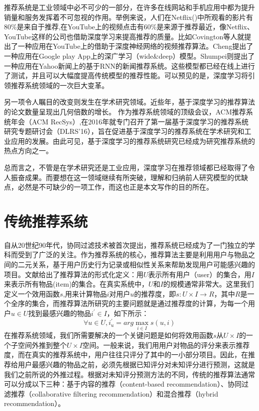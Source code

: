 推荐系统是工业领域中必不可少的一部分，在许多在线网站和手机应用中都为提升销量和服务发挥着不可忽视的作用。举例来说，人们在Netflix()中所观看的影片有$80\%$是来自于推荐\cite{Gomez-UribeH16Netflix},在YouTube上的视频点击有60\%是来源于推荐\cite{DavidsonLLNVGGHLLS10Youtube}最近，像Netflix、YouTube这样的公司也借助深度学习来提高推荐的质量\cite{ChengKHSCAACCIA16Wide&Deep}\cite{CovingtonAS16YouTube}\cite{OkuraTOT17Embedding}。比如Covington等人就提出了一种应用在YouTube上的借助于深度神经网络的视频推荐算法\cite{CovingtonAS16YouTube}。Cheng提出了一种应用在Google play App上的深广学习（wide\&deep）模型\cite{ChengKHSCAACCIA16Wide&Deep}。Shumpei则提出了一种应用在Yahoo新闻上的基于RNN的新闻推荐系统\cite{OkuraTOT17Embedding}。这些模型都已经在线上进行了测试，并且可以大幅度提高传统模型的推荐性能。可以预见的是，深度学习将引领推荐系统领域的一次巨大变革。

另一项令人瞩目的改变则发生在学术研究领域。近些年，基于深度学习的推荐算法的论文数量呈现出几何倍数的增长。
作为推荐系统领域的顶级会议，ACM推荐系统年会（ACM RecSys）,在2016年就专门召开了第一届基于深度学习的推荐系统研究专题研讨会（DLRS'16），旨在促进基于深度学习的推荐系统在学术研究和工业应用的发展。由此可见，基于深度学习的推荐系统研究已经成为研究推荐系统的热点方向之一。

总而言之，不管是在学术研究还是工业应用，深度学习在推荐领域都已经取得了令人振奋成果。而要想在这一领域继续有所突破，理解和归纳前人研究模型的优缺点，必然是不可缺少的一项工作，而这也正是本文写作的目的所在。




\chapter{传统推荐系统}
自从20世纪90年代，协同过滤技术被首次提出，推荐系统已经成为了一门独立的学科而受到了广泛的关注。作为推荐系统的核心，推荐算法主要是利用用户与物品之间的二元关系，基于用户历史行为记录或相似性关系来帮助发现用户可能感兴趣的项目。文献\cite{AdomaviciusT05}给出了推荐算法的形式化定义：用$U$表示所有用户（user）的集合，用$I$来表示所有物品(item)的集合。在真实系统中，$U$和$I$的规模通常非常大。这里我们定义一个效用函数$s$,用来计算物品$i$对用户$u$的推荐度，即$s:U \times I \rightarrow R$，其中$R$是一个全序的集合，而推荐算法所研究的主要问题就是通过推荐度的计算，为每一个用户$u \in U$找到最感兴趣的物品$i^{'} \in I$，如下所示：
\begin{equation}
\forall u \in U, i_u^{'} = arg \max_{i \in I} s(u,i)
\end{equation}		
在推荐系统领域，我们所需要解决的一个关键问题是如何将效用函数$s$从$U \times I$的一个子空间外推到整个$U \times I$空间。一般来说，我们用用户对物品的评分来表示推荐度，而在真实的推荐系统中，用户往往只评分了其中的一小部分项目。因此，在推荐给用户最感兴趣的物品之前，必须先根据已知评分对未知评分进行预测，这就是我们之前所说的外推过程。根据对未知评分预测方法的不同，传统的推荐算法通常可以分成以下三种\cite{VerbertMOWDBD12ContextAware}：基于内容的推荐（content-based recommendation）、协同过滤推荐（collaborative filtering recommendation）和混合推荐（hybrid recommendation）。
